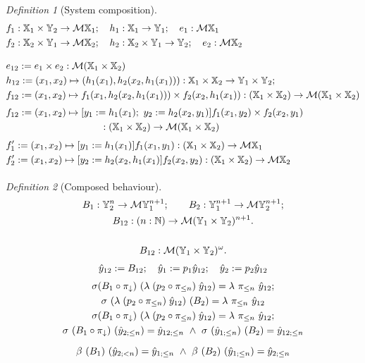 \documentclass[12pt,a4paper]{article}
\theoremstyle{remark}
\newtheorem*{definition*}{Definition}
\newcommand{\bind}{\beta}
\newcommand{\lift}{\lambda}
\renewcommand{\skew}{\sigma}
\newcommand{\N}{\mathbb{N}}
\newcommand{\X}{\mathbb{X}}
\newcommand{\Y}{\mathbb{Y}}
\newcommand{\M}{\mathcal{M}}
\newcommand{\hy}{\hat{y}}
\newcommand{\p}{\pi}
\newcommand{\pr}{\p_{\downarrow}}
\begin{document}
\begin{definition*}[System composition]
\[ \begin{aligned}
& f_1 : \X_1 \times \Y_2 \to \M\X_1; \quad h_1:\X_1\to\Y_1; \quad e_1:\M\X_1 \\
& f_2 : \X_2 \times \Y_1 \to \M\X_2; \quad h_2:\X_2\times\Y_1\to\Y_2; \quad e_2:\M\X_2 \\[3\jot]
& e_{12} := e_1 \times e_2 : \M(\X_1\times\X_2) \\
& h_{12} := (x_1,x_2) \mapsto (h_1(x_1),h_2(x_2,h_1(x_1))) : \X_1\times\X_2 \to \Y_1\times \Y_2 ; \\
& f_{12} := (x_1,x_2) \mapsto f_1(x_1,h_2(x_2,h_1(x_1))) \times f_2(x_2,h_1(x_1)) : (\X_1\times\X_2) \to \M(\X_1\times\X_2)  \\[\jot]
& f_{12} := (x_1,x_2) \mapsto \begin{aligned}[t] &[y_1:=h_1(x_1);\ y_2:=h_2(x_2,y_1)] f_1(x_1,y_2) \times f_2(x_2,y_1) \\ & \qquad : (\X_1\times\X_2) \to \M(\X_1\times\X_2) \end{aligned} \\[\jot]
& f_{1}' := (x_1,x_2) \mapsto [y_1:=h_1(x_1)] f_1(x_1,y_1) : (\X_1\times\X_2) \to \M\X_1 \\
& f_{2}' := (x_1,x_2) \mapsto [y_2:=h_2(x_2,h_1(x_1)] f_2(x_2,y_2) : (\X_1\times\X_2) \to \M\X_2 \\[\jot]
\end{aligned} \]
\end{definition*}

\begin{definition*}[Composed behaviour]
\[ \begin{gathered}
B_1 : \Y_2^n \to \M\Y_1^{n+1} ; \qquad B_2 : \Y_1^{n+1} \to \M\Y_2 ^{n+1};
\\ B_{12} : (n:\N) \to \M (\Y_1\times\Y_2)^{n+1} . \\
\\ B_{12} : \M (\Y_1\times\Y_2)^{\omega} . \\[\jot]
\hy_{12} := B_{12}; \quad \hy_1 := p_1 \hy_{12}; \quad \hy_2 := p_2 \hy_{12} \\[\jot]
\skew (B_1 \circ \pr)\ (\lift\;(p_2\circ\pi_{\leq n})\;\hy_{12}) = \lift\ \pi_{\leq n}\ \hy_{12}; \\
\skew\ (\lift\;(p_2\circ \pi_{\leq n})\;\hy_{12})\ (B_2) = \lift\ \pi_{\leq n}\  \hy_{12} \\
\skew (B_1 \circ \pr)\ (\lift\;(p_2\circ\pi_{\leq n})\;\hy_{12}) = \lift\ \pi_{\leq n}\ \hy_{12}; \\
\skew\ (B_1 \circ \pr)\ (\hy_{2;\leq n}) = \hy_{12;\leq n} \ \wedge \
\skew\ (\hy_{1;\leq n})\  (B_2) = \hy_{12;\leq n} \\[2\jot]
\bind\ (B_1)\ (\hy_{2;< n}) = \hy_{1;\leq n} \ \wedge \
\bind\ (B_2)\ (\hy_{1;\leq n}) = \hy_{2;\leq n}
\end{gathered}\]
\end{definition*}
\end{document}
